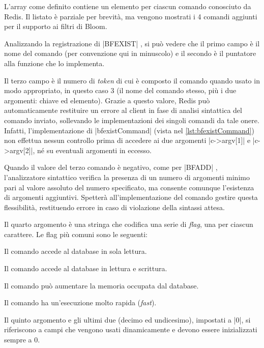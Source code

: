 L'array come definito contiene un elemento per ciascun comando conosciuto da Redis. Il listato è
parziale per brevità, ma vengono mostrati i 4 comandi aggiunti per il supporto ai filtri di Bloom.

Analizzando la registrazione di \cverb|BFEXIST| , si può vedere che il primo campo è il nome
del comando (per convenzione qui in minuscolo) e il secondo è il puntatore alla funzione che lo
implementa.

Il terzo campo è il numero di \emph{token} di cui è composto il comando quando usato in modo
appropriato, in questo caso $3$ (il nome del comando stesso, più i due argomenti: chiave ed
elemento). Grazie a questo valore, Redis può automaticamente restituire un errore al client in fase
di analisi sintattica del comando inviato, sollevando le implementazioni dei singoli comandi da tale
onere. Infatti, l'implementazione di \cverb|bfexistCommand| (vista nel \autoref{lst:bfexistCommand})
non effettua nessun controllo prima di accedere ai due argomenti \cverb|c->argv[1]| e
\cverb|c->argv[2]|, né su eventuali argomenti in eccesso.

Quando il valore del terzo comando è negativo, come per \cverb|BFADD| , l'analizzatore
sintattico verifica la presenza di un numero di argomenti minimo pari al valore assoluto del numero
specificato, ma consente comunque l'esistenza di argomenti aggiuntivi. Spetterà all'implementazione
del comando gestire questa flessibilità, restituendo errore in caso di violazione della sintassi
attesa.

Il quarto argomento è una stringa che codifica una serie di \emph{flag}, una per ciascun carattere.
Le flag più comuni sono le seguenti:

\begin{description}[leftmargin=!,labelwidth=2em,font={\bfseries\ttfamily}]
  \item[r] Il comando accede al database in sola lettura.
  \item[w] Il comando accede al database in lettura e scrittura.
  \item[m] Il comando può aumentare la memoria occupata dal database.
  \item[F] Il comando ha un'esecuzione molto rapida (\emph{fast}).
\end{description}

Il quinto argomento e gli ultimi due (decimo ed undicesimo), impostati a \cverb|0|, si riferiscono 
a campi che vengono usati dinamicamente e devono essere inizializzati sempre a $0$.

